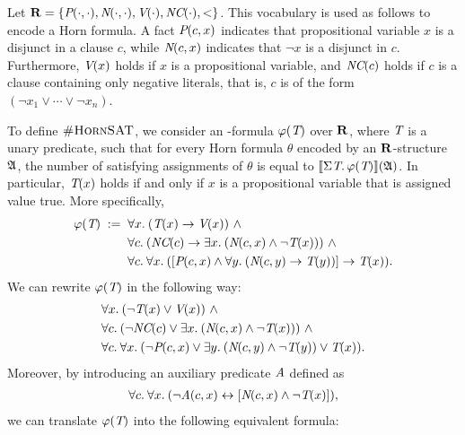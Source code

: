 \begin{exa} \label{ex-hornsat-esop1}
Let $\mathbf{R} = \{\textit{P}(\cdot,\cdot), \textit{N}(\cdot,\cdot), \textit{V}(\cdot), \textit{NC}(\cdot),<\}$. This vocabulary is used as follows to encode a Horn formula. A fact $\textit{P}(c,x)$ indicates that propositional variable $x$ is a disjunct in a clause $c$, while $\textit{N}(c,x)$ indicates that $\neg x$ is a disjunct in $c$. Furthermore, $\textit{V}(x)$ holds if  $x$ is a propositional variable, and $\textit{NC}(c)$ holds if $c$ is a clause containing only negative literals, that is, $c$ is of the form $(\neg x_1 \vee \cdots \vee \neg x_n)$.

To define $\textsc{\#HornSAT}$, we consider an \so-formula $\varphi(\textit{T})$ over $\mathbf{R}$, where $\textit{T}$ is a unary predicate, such that for every Horn formula $\theta$ encoded by an $\mathbf{R}$-structure $\mathfrak{A}$, the number of satisfying assignments of $\theta$ is equal to ${\llbracket{}{\Sigma{\textit{T}}.\, \varphi(\textit{T})}\rrbracket}(\mathfrak{A})$. In particular, $\textit{T}(x)$ holds if and only if $x$ is a propositional variable that is assigned value true.  More specifically, 
\begin{align*}
\varphi(\pT) \; :=\;\;  & \fa{x} (\pT(x) \to \pV(x)) \ \wedge\\
& \fa{c}  (\pNC(c) \to \ex{x} (\pN(c,x) \wedge \neg \pT(x))) \ \wedge\\
& \fa{c} \fa{x} ([\pP(c,x) \wedge \fa{y} (\pN(c,y) \to \pT(y))] \to \pT(x)).
\end{align*}
We can rewrite $\varphi(\textit{T})$ in the following way:
\begin{align*}
& \fa{x}  (\neg \pT(x) \vee \pV(x)) \ \wedge\\
& \fa{c}  (\neg \pNC(c) \vee \ex{x} (\pN(c,x) \wedge \neg \pT(x)))\ \wedge\\
& \fa{c} \fa{x}  (\neg \pP(c,x) \vee \ex{y} (\pN(c,y) \wedge \neg \pT(y)) \vee \pT(x)).
\end{align*}
Moreover, by introducing an auxiliary predicate $\textit{A}$ defined as 
\begin{align*}
\forall{c}.\: \forall{x}.\:  (\neg \textit{A}(c,x) \leftrightarrow [\textit{N}(c,x) \wedge \neg \textit{T}(x)]),
\end{align*}
we can translate $\varphi(\textit{T})$ into the following equivalent formula:

\end{exa}
